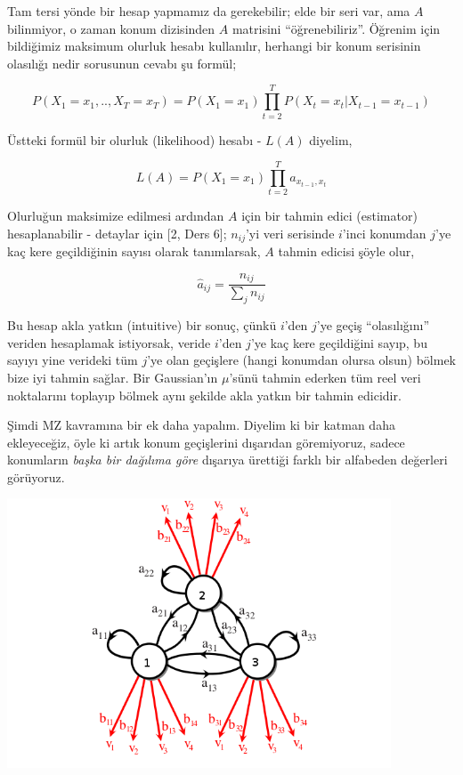 \documentclass[12pt,fleqn]{article}\usepackage{../../common}
\begin{document}
Tam tersi yönde bir hesap yapmamız da gerekebilir; elde bir seri var, ama
$A$ bilinmiyor, o zaman konum dizisinden $A$ matrisini
``öğrenebiliriz''. Öğrenim için bildiğimiz maksimum olurluk hesabı
kullanılır, herhangi bir konum serisinin olasılığı nedir sorusunun cevabı
şu formül;

$$ P(X_1=x_1,..,X_T=x_T) = 
P(X_1=x_1) \prod_{t=2}^{T} P(X_t=x_t | X_{t-1}=x_{t-1})
$$

Üstteki formül bir olurluk (likelihood) hesabı - $L(A)$ diyelim, 

$$ L(A) = P(X_1=x_1) \prod_{ t=2}^{T} a_{x_{t-1},x_t} $$

Olurluğun maksimize edilmesi ardından $A$ için bir tahmin edici
(estimator) hesaplanabilir - detaylar için [2, Ders 6]; $n_{ij}$'yi veri
serisinde $i$'inci konumdan $j$'ye kaç kere geçildiğinin sayısı olarak
tanımlarsak, $A$ tahmin edicisi şöyle olur,

$$ \hat{a}_{ij} = \frac{n_{ij}}{\sum_j n_{ij}}  $$

Bu hesap akla yatkın (intuitive) bir sonuç, çünkü $i$'den $j$'ye geçiş
``olasılığını'' veriden hesaplamak istiyorsak, veride $i$'den $j$'ye kaç
kere geçildiğini sayıp, bu sayıyı yine verideki tüm $j$'ye olan geçişlere
(hangi konumdan olursa olsun) bölmek bize iyi tahmin sağlar. Bir
Gaussian'ın $\mu$'sünü tahmin ederken tüm reel veri noktalarını toplayıp
bölmek aynı şekilde akla yatkın bir tahmin edicidir.

Şimdi MZ kavramına bir ek daha yapalım. Diyelim ki bir katman daha
ekleyeceğiz, öyle ki artık konum geçişlerini dışarıdan göremiyoruz, sadece
konumların {\em başka bir dağılıma göre} dışarıya ürettiği farklı bir
alfabeden değerleri görüyoruz.

\includegraphics[height=8cm]{tser_hmm_02.png}
\end{document}
